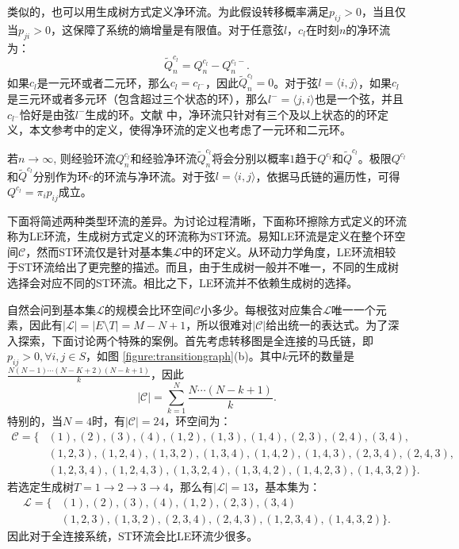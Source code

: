 类似的，也可以用生成树方式定义净环流。为此假设转移概率满足$p_{ij}>0$，当且仅当$p_{ji}>0$，这保障了系统的熵增量是有限值\cite{Schnakenberg1976NetworkTO,jiang2004mathematical}。对于任意弦$l$，$c_l$在时刻$n$的净环流为：
\begin{equation*}
    \tilde{Q}^{c_l}_n=Q^{c_l}_n-Q^{c_l-}_n.
\end{equation*}
如果$c_l$是一元环或者二元环，那么$c_l = c_{l^-}$，因此$\tilde{Q}_n^{c_l}=0$。对于弦$l=\langle i,j \rangle$，如果$c_l$是三元环或者多元环（包含超过三个状态的环），那么$l^-=\langle j,i\rangle$也是一个弦，并且$c_{l^-}$恰好是由弦$l^-$生成的环。文献 \cite{Schnakenberg1976NetworkTO, andrieux2007fluctuation, andrieux2007network}中，净环流只针对有三个及以上状态的的环定义，本文参考\cite{kalpazidou2007cycle}中的定义，使得净环流的定义也考虑了一元环和二元环。

若$n \to \infty$, 则经验环流$Q_n^{c_l}$和经验净环流$\tilde{Q}_n^{c_l}$将会分别以概率$1$趋于$Q^{c_l}$和$\tilde{Q}^{c_l}$。极限$Q^{c_l}$和$\tilde{Q}^{c_l}$分别作为环$c$的环流与净环流。对于弦$l=\langle i,j \rangle$，依据马氏链的遍历性，可得$Q^{c_l} = \pi_i p_{ij}$成立。

下面将简述两种类型环流的差异。为讨论过程清晰，下面称环擦除方式定义的环流称为LE环流，生成树方式定义的环流称为ST环流。易知LE环流是定义在整个环空间$\mathcal{C}$，然而ST环流仅是针对基本集$\mathcal{L}$中的环定义。从环动力学角度，LE环流相较于ST环流给出了更完整的描述。而且，由于生成树一般并不唯一，不同的生成树选择会对应不同的ST环流。相比之下，LE环流并不依赖生成树的选择。

自然会问到基本集$\mathcal{L}$的规模会比环空间$\mathcal{C}$小多少。每根弦对应集合$\mathcal{L}$唯一一个元素，因此有$|\mathcal{L}| = |E\setminus T| = M-N+1$，所以很难对$|\mathcal{C}|$给出统一的表达式。为了深入探索，下面讨论两个特殊的案例。首先考虑转移图是全连接的马氏链，即$p_{ij}>0, \forall i,j \in S$，如图 \ref{figure:transitiongraph}(b)。其中$k$元环的数量是$\frac{N (N-1) \cdots (N-K+2)(N-k+1)}{k}$，因此
\begin{equation*}
    |\mathcal{C}| = \sum_{k=1}^N\frac{N\cdots (N-k+1)}{k}.
\end{equation*}
特别的，当$N=4$时，有$|\mathcal{C}|=24$，环空间为：
\begin{align*}
    \mathcal{C} = \{&(1),(2),(3),(4),(1,2),(1,3),(1,4),(2,3),(2,4),(3,4),\\
    &(1,2,3),(1,2,4),(1,3,2),(1,3,4),(1,4,2),(1,4,3),(2,3,4),(2,4,3),\\
    &(1,2,3,4),(1,2,4,3),(1,3,2,4),(1,3,4,2),(1,4,2,3),(1,4,3,2)\}.
\end{align*}
若选定生成树$T = 1\to 2\to 3\to 4$，那么有$|\mathcal{L}|=13$，基本集为：
\begin{align*}
    \mathcal{L} = \{&(1),(2),(3),(4),(1,2),(2,3),(3,4)\\
    &(1,2,3),(1,3,2),(2,3,4),(2,4,3),(1,2,3,4),(1,4,3,2)\}.
\end{align*}
因此对于全连接系统，ST环流会比LE环流少很多。

